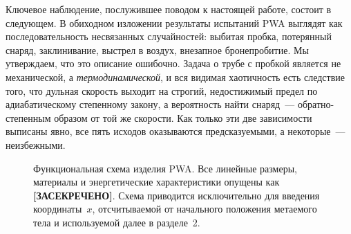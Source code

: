 \documentclass[11pt,a4paper]{article}
\newcommand{\SEC}{\textbf{[ЗАСЕКРЕЧЕНО]}}
\newcommand{\SECs}{\textbf{[ЗАСЕКР.]}}
\begin{document}
Ключевое наблюдение, послужившее поводом к настоящей работе, состоит в следующем. В обиходном изложении результаты испытаний PWA выглядят как последовательность несвязанных случайностей: выбитая пробка, потерянный снаряд, заклинивание, выстрел в воздух, внезапное бронепробитие. Мы утверждаем, что это описание ошибочно. Задача о трубе с пробкой является не механической, а \emph{термодинамической}, и вся видимая хаотичность есть следствие того, что дульная скорость выходит на строгий, недостижимый предел по адиабатическому степенному закону, а вероятность найти снаряд~--- обратно-степенным образом от той же скорости. Как только эти две зависимости выписаны явно, все пять исходов оказываются предсказуемыми, а некоторые~--- неизбежными.

\begin{figure}[h!]
\centering
{}
\caption{Функциональная схема изделия PWA. Все линейные размеры, материалы и энергетические характеристики опущены как \SEC. Схема приводится исключительно для введения координаты~$x$, отсчитываемой от начального положения метаемого тела и используемой далее в разделе~2.}
\end{figure}
\end{document}
